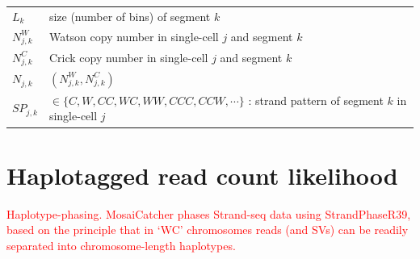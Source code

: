 \documentclass[12pt]{article}
\renewcommand{\j}{j} %
\renewcommand{\k}{k} %
\newcommand{\N}{N} %
\begin{document}
\begin{table}[tb]
\begin{tabular}{  p{4cm} p{12.5cm} }
		$L_\k$ & size (number of bins) of segment $\k$\\
		
		$\N_{\j, \k}^W$ & Watson copy number in single-cell $\j$ and segment $\k$\\
		
		$\N_{\j, \k}^C$ & Crick copy number in single-cell $\j$ and segment $\k$\\
		
		$\N_{\j, \k}$ & $(\N_{\j, \k}^W, \N_{\j, \k}^C)$\\
		
		$SP_{\j,\k}$ & $\in \{C,W,CC,WC,WW,CCC,CCW, \cdots\}$ : strand pattern of segment $\k$ in single-cell $\j$\\
		\hline
	\end{tabular}
	\label{notations}\vspace{-4.5mm}
\end{table}

\section{Haplotagged read count likelihood}
\textcolor{red}{
Haplotype-phasing. MosaiCatcher phases Strand-seq data using StrandPhaseR39, based on the principle that in ‘WC’ chromosomes reads (and SVs) can be readily separated into chromosome-length haplotypes.}


% 
% 
% 
% 




\end{document}
